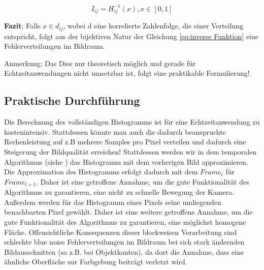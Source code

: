 \begin{equation}\label{eq:inverse Funktion}
    I_{ij} = H_{ij}^{-1}(x), x \in [0,1]
\end{equation}

\par

\textbf{Fazit}: Falls $x \in d_{ij}$, wobei d eine korrelierte Zahlenfolge, die einer 
 Verteilung entspricht, folgt aus der bijektiven
Natur der Gleichung \ref{eq:inverse Funktion} eine  
Fehlerverteilungen im Bildraum. 

Anmerkung: Das Dies nur theoretisch möglich und gerade für Echtzeitanwendungen nicht umsetzbar ist, 
folgt eine praktikable Formulierung!

\subsection{Praktische Durchführung}

Die Berechnung des vollständigen Histogramms ist für eine Echtzeitanwendung
zu kostenintensiv. Stattdessen könnte man auch die dadurch beanspruchte 
Rechenleistung auf z.B mehrere Samples pro Pixel verteilen und dadurch eine 
Steigerung der Bildqualität erreichen!
Stattdessen werden wir in dem temporalen Algorithmus (siehe \cite{hal02158423})
das Histogramm mit dem vorherigen Bild approximieren. 
Die Approximation des Histogramms erfolgt dadurch mit dem $Frame_{t}$ 
für $Frame_{t+1}$. Daher ist eine getroffene Annahme, um die gute Funktionalität des 
Algorithmus zu garantieren, eine nicht zu schnelle Bewegung der Kamera.
Außerdem werden für das Histogramm eines Pixels seine umliegenden benachbarten Pixel gewählt.
Daher ist eine weitere getroffene Annahme, um die gute Funktionalität des 
Algorithmus zu garantieren, eine möglichst homogene Fläche. 
Offensichtliche Konsequenzen dieser blockweisen Verarbeitung sind schlechte blue noise 
Fehlerverteilungen im Bildraum bei sich stark ändernden Bildausschnitten
(so z.B. bei Objektkanten), da dort die Annahme, dass eine ähnliche Oberfläche
zur Farbgebung beiträgt verletzt wird.

